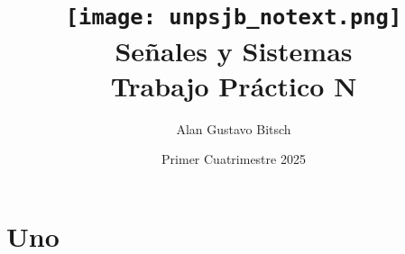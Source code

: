 \documentclass[11pt]{article}
\title{
    \texttt{[image: unpsjb\_notext.png]} \\
    \vspace{1.5cm}
    Señales y Sistemas \\ 
    Trabajo Práctico N
    }
\date {Primer Cuatrimestre 2025}
\author{Alan Gustavo Bitsch}
\begin{document}
\maketitle

\section{Uno}
\end{document}
